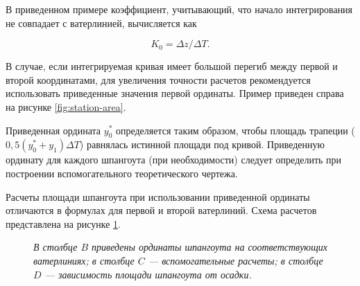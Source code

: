 В приведенном примере коэффициент, учитывающий, что начало интегрирования не совпадает с ватерлинией, вычисляется как

\begin{equation}
    K_0 = \Delta z / \Delta T.
\end{equation}

В случае, если интегрируемая кривая имеет большой перегиб между первой и второй координатами, для увеличения точности расчетов рекомендуется использовать приведенные значения первой ординаты.
Пример приведен справа на рисунке \ref{fig:station-area}.

Приведенная ордината $y_0^*$ определяется таким образом, чтобы площадь трапеции ($0{,}5(y_0^*+y_1)\Delta T$) равнялась истинной площади под кривой.
Приведенную ординату для каждого шпангоута (при необходимости) следует определить при построении вспомогательного теоретического чертежа.

Расчеты площади шпангоута при использовании приведенной ординаты отличаются в формулах для первой и второй ватерлиний.
Схема расчетов представлена на рисунке \ref{fig:station-area-2}.

\begin{figure}
    \footnotesize
    \centering
    \caption{Схема расчета зависимости площади шпангоута от осадки в табличном редакторе. Приведенная ордината}
    \caption*{\textit{В столбце $B$ приведены ординаты шпангоута на соответствующих ватерлиниях;
    в столбце $C$ --- вспомогательные расчеты;
    в столбце $D$ --- зависимость площади шпангоута от осадки.}}
    \label{fig:station-area-2}
\end{figure}

